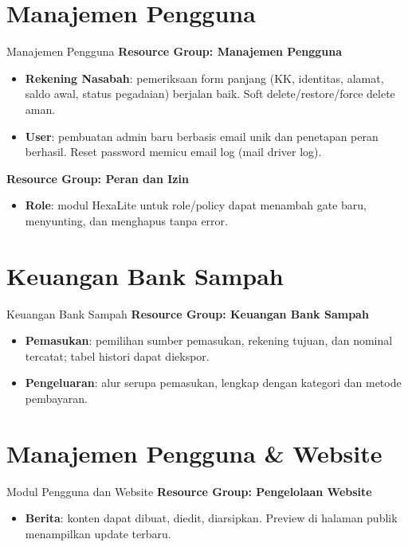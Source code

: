 \documentclass[aspectratio=169]{beamer}
\begin{document}
\section{Manajemen Pengguna}
\begin{frame}{Manajemen Pengguna}
  \textbf{Resource Group: Manajemen Pengguna}
  \begin{itemize}
    \item \textbf{Rekening Nasabah}: pemeriksaan form panjang (KK, identitas, alamat, saldo awal, status pegadaian) berjalan baik. Soft delete/restore/force delete aman.
    \item \textbf{User}: pembuatan admin baru berbasis email unik dan penetapan peran berhasil. Reset password memicu email log (mail driver log).
  \end{itemize}
  \vspace{0.5cm}
  \textbf{Resource Group: Peran dan Izin}
  \begin{itemize}
    \item \textbf{Role}: modul HexaLite untuk role/policy dapat menambah gate baru, menyunting, dan menghapus tanpa error.
  \end{itemize}
\end{frame}

\section{Keuangan Bank Sampah}
\begin{frame}{Keuangan Bank Sampah}
  \textbf{Resource Group: Keuangan Bank Sampah}
  \begin{itemize}
    \item \textbf{Pemasukan}: pemilihan sumber pemasukan, rekening tujuan, dan nominal tercatat; tabel histori dapat diekspor.
    \item \textbf{Pengeluaran}: alur serupa pemasukan, lengkap dengan kategori dan metode pembayaran.
  \end{itemize}
\end{frame}

\section{Manajemen Pengguna \& Website}
\begin{frame}{Modul Pengguna dan Website}
  \textbf{Resource Group: Pengelolaan Website}
  \begin{itemize}
    \item \textbf{Berita}: konten dapat dibuat, diedit, diarsipkan. Preview di halaman publik menampilkan update terbaru.
  \end{itemize}
\end{frame}
\end{document}
